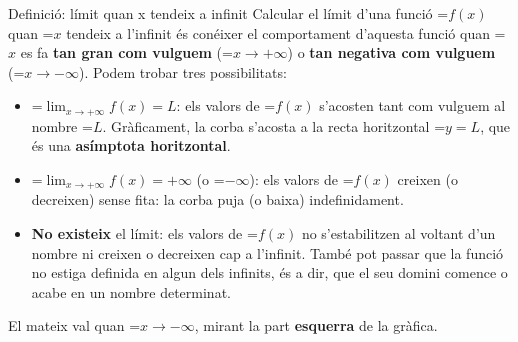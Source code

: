 \documentclass[11pt,a4paper]{article}
\newcommand{\fmm}[1]{\setbox0=\hbox{$#1$}\ifdim\wd0>\linewidth\[#1\]\else\mbox{\box0}\fi}
\begin{document}
  
\begin{fmdef}{Definició: límit quan x tendeix a infinit}
Calcular el límit d'una funció \fmm{f(x)} quan \fmm{x} tendeix a l'infinit és conéixer el comportament d'aquesta funció quan \fmm{x} es fa \textbf{tan gran com vulguem} (\fmm{x\to+\infty}) o \textbf{tan negativa com vulguem} (\fmm{x\to-\infty}). Podem trobar tres possibilitats:

      
\begin{itemize}
\item \fmm{\displaystyle\lim_{x\to+\infty}f(x)=L}: els valors de \fmm{f(x)} s'acosten tant com vulguem al nombre \fmm{L}. Gràficament, la corba s'acosta a la recta horitzontal \fmm{y=L}, que és una \textbf{asímptota horitzontal}.
\item \fmm{\displaystyle\lim_{x\to+\infty}f(x)=+\infty} (o \fmm{-\infty}): els valors de \fmm{f(x)} creixen (o decreixen) sense fita: la corba puja (o baixa) indefinidament.
\item \textbf{No existeix} el límit: els valors de \fmm{f(x)} no s'estabilitzen al voltant d'un nombre ni creixen o decreixen cap a l'infinit. També pot passar que la funció no estiga definida en algun dels infinits, és a dir, que el seu domini comence o acabe en un nombre determinat.
\end{itemize}

      

El mateix val quan \fmm{x\to-\infty}, mirant la part \textbf{esquerra} de la gràfica.
\end{fmdef}
\end{document}
